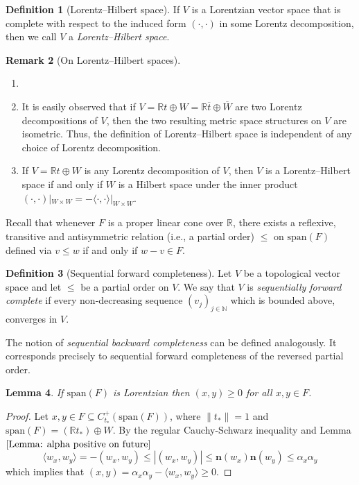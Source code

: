 \documentclass[a4paper,11pt]{article}
\numberwithin{equation}{section}
\theoremstyle{definition}
\newtheorem{Definition}{Definition}[section]
\newtheorem{Remark}[Definition]{Remark}
\theoremstyle{plain}
\newtheorem{Lemma}[Definition]{Lemma}
\newcommand{\R}{\mathbb R}
\newcommand{\N}{\mathbb N}
\newcommand{\spn}{\mathrm{span}}
\newcommand{\inner}[2]{\langle #1, #2 \rangle}
\begin{document}
\begin{Definition}[Lorentz--Hilbert space]\label{Def: Lorentz Hilbert}
    If $V$ is a Lorentzian vector space that is complete with respect to the induced form $(\cdot, \cdot)$ in some Lorentz decomposition, then we call $V$ a \textit{Lorentz--Hilbert space}.
\end{Definition}

\begin{Remark}[On Lorentz--Hilbert spaces]
\begin{enumerate}
    \item[]
    \item It is easily observed that if $V = \R t \oplus W = \R \overline{t} \oplus \overline{W}$ are two Lorentz decompositions of $V$, then the two resulting metric space structures on $V$ are isometric. Thus, the definition of Lorentz--Hilbert space is independent of any choice of Lorentz decomposition.
    \item If $V = \R t \oplus W$ is any Lorentz decomposition of $V$, then $V$ is a Lorentz--Hilbert space if and only if $W$ is a Hilbert space under the inner product $(\cdot, \cdot)|_{W \times W} = -\inner{\cdot}{\cdot}|_{W \times W}$.
\end{enumerate}
\end{Remark}


Recall that whenever $F$ is a proper linear cone over $\R$, there exists a reflexive, transitive and antisymmetric relation (i.e., a partial order) $\leq$ on $\spn(F)$ defined via $v \leq w$ if and only if $w - v \in F$.

\begin{Definition}[Sequential forward completeness]
    Let $V$ be a topological vector space and let $\leq$ be a partial order on $V$. We say that $V$ is \textit{sequentially forward complete} if every non-decreasing sequence $(v_{j})_{j \in \N}$ which is bounded above, converges in $V$.
\end{Definition}

The notion of \textit{sequential backward completeness} can be defined analogously. It corresponds precisely to sequential forward completeness of the reversed partial order.

\begin{Lemma}
    If $\spn(F)$ is Lorentzian then $(x, y) \geq 0$ for all  $x, y \in F$.
\end{Lemma}

\begin{proof}
    Let $x, y \in F \subseteq C_{t_*}^+(\spn(F))$, where $\|t_*\| = 1$ and $\spn(F) = (\R t_*) \oplus W$. By the regular Cauchy-Schwarz inequality and Lemma $\ref{Lemma: alpha positive on future}$
    $$\inner{w_{x}}{w_{y}} = - (w_{x}, w_{y})\leq |(w_{x}, w_{y})| \leq \mathbf{n}(w_{x})\mathbf{n}(w_{y}) \leq \alpha_{x}\alpha_{y}$$
    which implies that $(x, y) = \alpha_{x}\alpha_{y} - \inner{w_{x}}{w_{y}} \geq 0.$
\end{proof}
\end{document}
